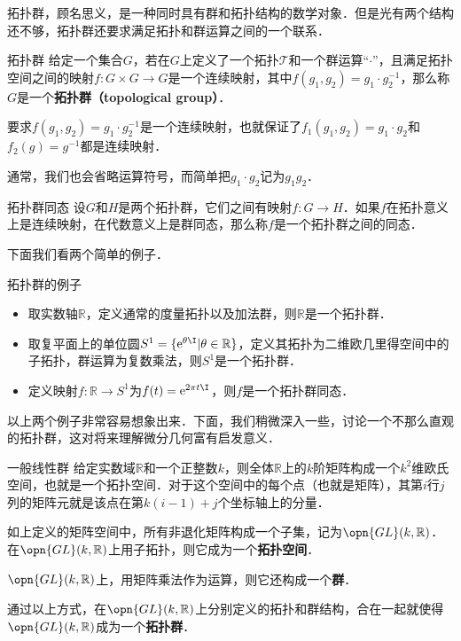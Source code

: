 


拓扑群，顾名思义，是一种同时具有群和拓扑结构的数学对象．但是光有两个结构还不够，拓扑群还要求满足拓扑和群运算之间的一个联系．

\begin{definition}{拓扑群}
给定一个集合$G$，若在$G$上定义了一个拓扑$\mathcal{T}$和一个群运算“$\cdot$”，且满足拓扑空间之间的映射$f:G\times G\rightarrow G$是一个连续映射，其中$f(g_1, g_2)=g_1\cdot g_2^{-1}$，那么称$G$是一个\textbf{拓扑群（topological group）}．
\end{definition}

要求$f(g_1, g_2)=g_1\cdot g_2^{-1}$是一个连续映射，也就保证了$f_1(g_1, g_2)=g_1\cdot g_2$和$f_2(g)=g^{-1}$都是连续映射．

通常，我们也会省略运算符号，而简单把$g_1\cdot g_2$记为$g_1g_2$．

\begin{definition}{拓扑群同态}
设$G$和$H$是两个拓扑群，它们之间有映射$f:G\rightarrow H$．如果$f$在拓扑意义上是连续映射，在代数意义上是群同态，那么称$f$是一个拓扑群之间的同态．
\end{definition}

下面我们看两个简单的例子．

\begin{example}{拓扑群的例子}
\begin{itemize}
\item 取实数轴$\mathbb{R}$，定义通常的度量拓扑以及加法群，则$\mathbb{R}$是一个拓扑群．
\item 取复平面上的单位圆$S^1=\{\mathrm{e}^{\theta\I}|\theta\in\mathbb{R}\}$，定义其拓扑为二维欧几里得空间中的子拓扑，群运算为复数乘法，则$S^1$是一个拓扑群．
\item 定义映射$f:\mathbb{R}\rightarrow S^1$为$f(t)=\mathrm{e}^{2\pi t\I}$，则$f$是一个拓扑群同态．
\end{itemize}
\end{example}

以上两个例子非常容易想象出来．下面，我们稍微深入一些，讨论一个不那么直观的拓扑群，这对将来理解微分几何富有启发意义．

\begin{example}{一般线性群}
给定实数域$\mathbb{R}$和一个正整数$k$，则全体$\mathbb{R}$上的$k$阶矩阵构成一个$k^2$维欧氏空间，也就是一个拓扑空间．对于这个空间中的每个点（也就是矩阵），其第$i$行$j$列的矩阵元就是该点在第$k(i-1)+j$个坐标轴上的分量．

如上定义的矩阵空间中，所有非退化矩阵构成一个子集，记为$\opn{GL}(k, \mathbb{R})$．在$\opn{GL}(k,\mathbb{R})$上用子拓扑，则它成为一个\textbf{拓扑空间}．

$\opn{GL}(k,\mathbb{R})$上，用矩阵乘法作为运算，则它还构成一个\textbf{群}．

通过以上方式，在$\opn{GL}(k, \mathbb{R})$上分别定义的拓扑和群结构，合在一起就使得$\opn{GL}(k, \mathbb{R})$成为一个\textbf{拓扑群}．
\end{example}

